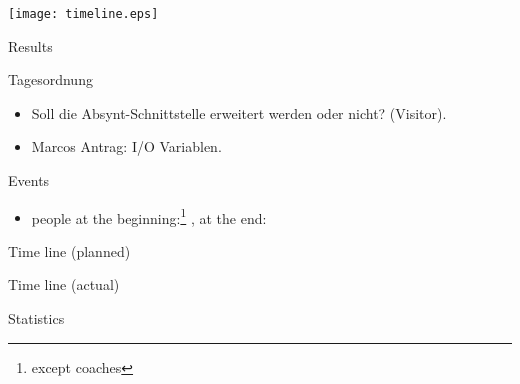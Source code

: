 \texttt{[image: timeline.eps]}

\begin{myslide}{Results}
  
\end{myslide}


\begin{myslide}{Tagesordnung}
  \begin{itemize}
  \item Soll die Absynt-Schnittstelle erweitert werden oder nicht?
    (Visitor).
  \item Marcos Antrag: I/O Variablen.
  \end{itemize}
  
\end{myslide}

\begin{myslide}{Events}
  \begin{itemize}
  \item people at the beginning:\footnote{except coaches} ,
    at the end: 
  \end{itemize}
\end{myslide}

\begin{myslide}{Time line (planned)}

\end{myslide}
\begin{myslide}{Time line  (actual)}
  
\end{myslide}

\begin{myslide}{Statistics}
  
\end{myslide}





